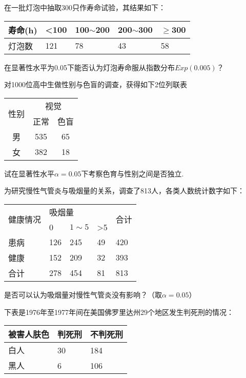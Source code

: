 \begin{xiti}
\item 在一批灯泡中抽取300只作寿命试验，其结果如下：
\begin{table}[!htp]
	\centering
	\begin{tabularx}{1.0\textwidth}{Z|ZZZZ}
		寿命(h)&<100&100$\sim$200&200$\sim $300&$\geq $300\\
		\midrule
		灯泡数&121&78&43&58
	\end{tabularx}
\end{table}

在显著性水平为0.05下能否认为灯泡寿命服从指数分布$Exp(0.005)$？

\item 对1000位高中生做性别与色盲的调查，获得如下2位列联表
\begin{table}[!htb]
	\centering
	\begin{tabular}{c|cc}\hline
		\multirow{2}[0]{*}{性别} & \multicolumn{2}{c}{视觉} \\
		& 正常    & 色盲 \\\hline
		男     & 535   & 65 \\\hline
		女     & 382   & 18 \\\hline
	\end{tabular}
\end{table}

试在显著性水平$\alpha=0.05$下考察色育与性别之间是否独立.

\item 为研究慢性气管炎与吸烟量的关系，调查了813人，各类人数统计数字如下：
\begin{table}[!htb]
	\centering
	\begin{tabular}{l|llll}
		\toprule
		\multirow{2}{*}{健康情况} & \multicolumn{3}{l}{\hspace{2em}吸烟量} & \multirow{2}{*}{合计} \\
		& 0      & $1\sim 5$    & >5   &                     \\
		\midrule
		患病                    & 126    & 245    & 49    & 420                 \\
		健康                    & 152    & 209    & 32    & 393                 \\
		合计                    & 278    & 454    & 81    & 813                \\
		\bottomrule
	\end{tabular}
\end{table}
是否可以认为吸烟量对慢性气管炎没有影响？（取$\alpha=0.05$）

\item 下表是1976年至1977年间在美国佛罗里达州29个地区发生判死刑的情况：
	\begin{table}[!ht]
	\centering
	\begin{tabularx}{1.0\textwidth}{Z|ZZ}
		\toprule
		被害人肤色&判死刑&不判死刑\\
		\midrule
		白人&30&184\\
		黑人&6&106\\
		\bottomrule
	\end{tabularx}
\end{table}



\end{xiti}
